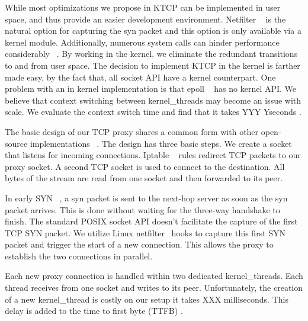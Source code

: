 While most optimizations we propose in KTCP can be implemented in user space, and thus provide an easier development environment. Netfilter ~\cite{netfilter} is the natural option for capturing the syn packet and this option is only available via a kernel module. Additionally, numerous system calls can hinder performance considerably ~\cite{Copy, FlexSC}. By working in the kernel, we eliminate the redundant transitions to and from user space. The decision to implement KTCP in the kernel is farther made easy, by the fact that, all socket API have a kernel counterpart. One problem with an in kernel implementation is that epoll ~\cite{epoll} has no kernel API. We believe that context switching between kernel\_threads may become an issue with scale. We evaluate the context switch time and find that it takes YYY Yseconds .

 The basic design of our TCP proxy shares a common form with other open-source implementations ~\cite{SOCKS, WhatEverAranIsUsing}. The design has three basic steps. We create a socket that listens for incoming connections. Iptable ~\cite{iptables} rules redirect TCP packets to our proxy socket. A second TCP socket is used to connect to the destination. All bytes of the stream are read from one socket and then forwarded to its peer.

 In early SYN ~\cite{Ladiwala}, a syn packet is sent to the next-hop server as soon as the syn packet arrives. This is done without waiting for the three-way handshake to finish. The standard POSIX socket API doesn't facilitate the capture of the first TCP SYN packet.  We utilize Linux netfilter~\cite{netfilter} hooks  to capture this first SYN packet and trigger the start of a new connection. This allows the proxy to establish the two connections in parallel. 

 Each new proxy connection is handled within two dedicated kernel\_threads.  Each thread receives from one socket and writes to its peer. Unfortunately, the creation of a new kernel\_thread is costly on our setup it takes XXX milliseconds.  This delay is added to the time to first byte (TTFB) . 


